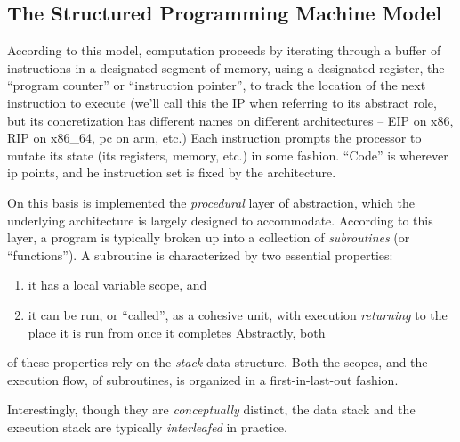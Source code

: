 \documentclass[12pt,glossary]{dalthesis}
\begin{document}
\subsection{The Structured Programming Machine Model}
\label{sec:org55b2849}
\label{orgf87f821}



According to this model, computation proceeds by iterating through a buffer of
instructions in a designated segment of memory, using a designated register, the
``program counter'' or ``instruction pointer'', to track the location of the next
instruction to execute (we'll call this the IP when referring to its abstract
role, but its concretization has different names on different architectures --
EIP on x86, RIP on x86\_64, \gls{pc} on \gls{arm}, etc.) Each instruction prompts the
processor to mutate its state (its registers, memory, etc.) in some fashion.
``Code'' is wherever \gls{ip} points, and he instruction set is fixed by the
architecture.

On this basis is implemented the \emph{procedural} layer of abstraction, which the
underlying architecture is largely designed to accommodate. According to this
layer, a program is typically broken up into a collection of \emph{subroutines} (or
``functions''). A subroutine is characterized by two essential properties:
\begin{enumerate}
\item it has a local variable scope, and
\item it can be run, or ``called'', as a cohesive unit, with execution
\emph{returning} to the place it is run from once it completes Abstractly, both
\end{enumerate}
of these properties rely on the \emph{stack} data structure. Both the scopes, and the
execution flow, of subroutines, is organized in a first-in-last-out fashion.

Interestingly, though they are \emph{conceptually} distinct, the data stack and the
execution stack are typically \emph{interleafed} in practice.
\end{document}

